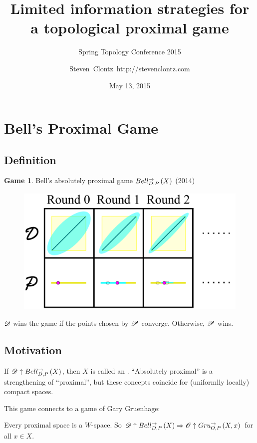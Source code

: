 \documentclass{beamer}
\title
{Limited information strategies for a topological proximal game}
\subtitle
{Spring Topology Conference 2015} %
\author%
{Steven~Clontz~http://stevenclontz.com}%
\institute[Auburn, AL] %
{
  Auburn, AL}
\date[15-05-13] %
{May 13, 2015}
\theoremstyle{definition}
\newtheorem{game}[theorem]{Game}
\begin{document}
\newcommand{\vspacing}{\vspace{1em}}
\newcommand{\vpause}{\pause\vspacing}

\begin{frame}
  \titlepage
\end{frame}


\section{Bell's Proximal Game}

\subsection{Definition}

\begin{frame}
  \small
  \begin{game}
  Bell's absolutely proximal game $Bell_{D,P}^{\to}\left({X}\right)$ \cite{MR3239205} (2014)
    \begin{figure}
      \includegraphics[width=0.6\linewidth]{proximalGamePrime.pdf}
    \end{figure}

  $\mathscr{D}$ wins the game if the points chosen by $\mathscr{P}$ converge.
  Otherwise, $\mathscr{P}$ wins.
  \end{game}
\end{frame}

\subsection{Motivation}

\begin{frame}
  If $\mathscr{D}\uparrow Bell_{D,P}^{\to}\left({X}\right)$, then $X$ is called an
  .
  ``Absolutely proximal'' is a strengthening of ``proximal'', but these
  concepts coincide for (uniformlly locally) compact spaces.

  \vpause

  This game connects to a game of Gary Gruenhage: \cite{MR3239205}

  \begin{theorem}
    Every proximal space is a $W$-space. So
    $\mathscr{D}\uparrow Bell_{D,P}^{\to}\left({X}\right) \Rightarrow \mathscr{O}\uparrow Gru_{O,P}^{\to}\left({X},{x}\right)$
    for all $x\in X$.
  \end{theorem}
\end{frame}
\end{document}
